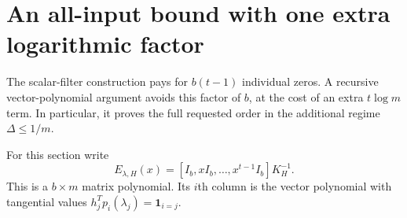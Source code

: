 \documentclass[11pt]{article}
\theoremstyle{definition}
\begin{document}
\section{An all-input bound with one extra logarithmic factor}
\label{sec:fractional}

The scalar-filter construction pays for $b(t-1)$ individual zeros. A
recursive vector-polynomial argument avoids this factor of $b$, at the
cost of an extra $t\log m$ term. In particular, it proves the full requested
order in the additional regime $\Delta\leq1/m$.

For this section write
\begin{equation}
 E_{\lambda,H}(x)=[I_b,xI_b,\ldots,x^{t-1}I_b]K_H^{-1}.
 \label{eq:evaluation}
\end{equation}
This is a $b\times m$ matrix polynomial. Its $i$th column is the vector
polynomial with tangential values $h_j^Tp_i(\lambda_j)=\mathbf1_{i=j}$.
\end{document}

